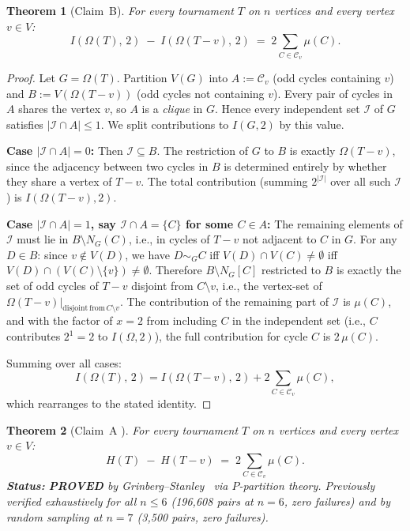 \documentclass[12pt,reqno]{amsart}
\theoremstyle{plain}
\newtheorem{theorem}{Theorem}[section]
\theoremstyle{definition}
\theoremstyle{remark}
\begin{document}
\noindent\begin{claimBbox}
\begin{theorem}[Claim~B]\label{thm:claimB}
For every tournament $T$ on $n$ vertices and every vertex $v \in V$:
\[
  I(\Omega(T),\,2) \;-\; I(\Omega(T{-}v),\,2) \;=\; 2\!\sum_{C \in \mathcal{C}_v} \mu(C).
\]
\end{theorem}
\begin{proof}
Let $G = \Omega(T)$. Partition $V(G)$ into $A := \mathcal{C}_v$ (odd cycles containing $v$)
and $B := V(\Omega(T{-}v))$ (odd cycles not containing $v$).
Every pair of cycles in $A$ shares the vertex $v$, so $A$ is a \emph{clique} in
$G$. Hence every independent set $\mathcal{I}$ of $G$ satisfies
$|\mathcal{I} \cap A| \leq 1$. We split contributions to $I(G,2)$ by this value.

\medskip
\noindent\textbf{Case $|\mathcal{I} \cap A| = 0$:} Then $\mathcal{I} \subseteq B$.
The restriction of $G$ to $B$ is exactly $\Omega(T{-}v)$, since the adjacency
between two cycles in $B$ is determined entirely by whether they share a vertex
of $T{-}v$. The total contribution (summing $2^{|\mathcal{I}|}$ over all such
$\mathcal{I}$) is $I(\Omega(T{-}v), 2)$.

\medskip
\noindent\textbf{Case $|\mathcal{I} \cap A| = 1$, say $\mathcal{I} \cap A = \{C\}$ for some $C \in A$:}
The remaining elements of $\mathcal{I}$ must lie in $B \setminus N_G(C)$, i.e., in
cycles of $T{-}v$ not adjacent to $C$ in $G$. For any $D \in B$: since $v \notin
V(D)$, we have $D \sim_G C$ iff $V(D) \cap V(C) \neq \emptyset$ iff
$V(D) \cap (V(C)\setminus\{v\}) \neq \emptyset$. Therefore $B \setminus N_G[C]$
restricted to $B$ is exactly the set of odd cycles of $T{-}v$ disjoint from
$C\setminus v$, i.e., the vertex-set of $\Omega(T{-}v)|_{\mathrm{disjoint\,from\,}C\setminus v}$.
The contribution of the remaining part of $\mathcal{I}$ is $\mu(C)$, and with
the factor of $x = 2$ from including $C$ in the independent set (i.e., $C$
contributes $2^1 = 2$ to $I(\Omega, 2)$), the full contribution for cycle $C$
is $2\,\mu(C)$.

\medskip
Summing over all cases:
\[
  I(\Omega(T),\,2) = I(\Omega(T{-}v),\,2) + 2\!\sum_{C \in \mathcal{C}_v} \mu(C),
\]
which rearranges to the stated identity.
\end{proof}
\end{claimBbox}

\noindent\begin{claimAbox}
\begin{theorem}[Claim~A {\cite{grinberg2024}}]\label{oq:claimA}
For every tournament $T$ on $n$ vertices and every vertex $v \in V$:
\[
  H(T) \;-\; H(T{-}v) \;=\; 2\!\sum_{C \in \mathcal{C}_v} \mu(C).
\]
\textbf{Status:} \textcolor{resolvedgreen}{\textbf{PROVED}} by Grinberg--Stanley~\cite{grinberg2024} via $P$-partition theory. Previously verified exhaustively for all $n \leq 6$ (196,608 pairs at $n=6$, zero failures) and by random sampling at $n=7$ (3,500 pairs, zero failures).
\end{theorem}
\end{claimAbox}
\end{document}
